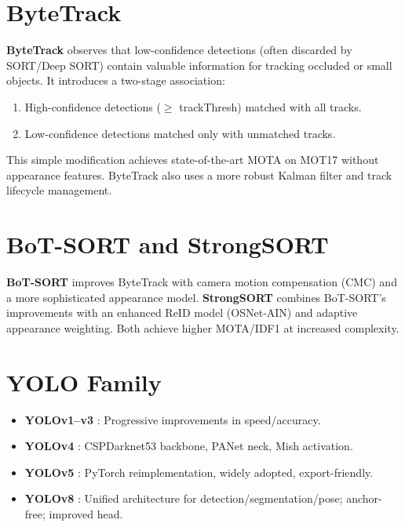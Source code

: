 \section{ByteTrack}
\label{sec:bytetrack}

\textbf{ByteTrack} \cite{zhang2021bytetrack} observes that low-confidence detections (often discarded by SORT/Deep SORT) contain valuable information for tracking occluded or small objects. It introduces a two-stage association:
\begin{enumerate}
    \item High-confidence detections ($\ge$ trackThresh) matched with all tracks.
    \item Low-confidence detections matched only with unmatched tracks.
\end{enumerate}
This simple modification achieves state-of-the-art MOTA on MOT17 without appearance features. ByteTrack also uses a more robust Kalman filter and track lifecycle management.

\section{BoT-SORT and StrongSORT}
\label{sec:botsort-strongsort}

\textbf{BoT-SORT} \cite{aharon2022botsort} improves ByteTrack with camera motion compensation (CMC) and a more sophisticated appearance model. \textbf{StrongSORT} \cite{du2023strongsort} combines BoT-SORT's improvements with an enhanced ReID model (OSNet-AIN) and adaptive appearance weighting. Both achieve higher MOTA/IDF1 at increased complexity.

\section{YOLO Family}
\label{sec:yolo-family}

\begin{itemize}
    \item \textbf{YOLOv1--v3} \cite{redmon2016yolo,redmon2017yolo9000,redmon2018yolov3}: Progressive improvements in speed/accuracy.
    \item \textbf{YOLOv4} \cite{bochkovskiy2020yolov4}: CSPDarknet53 backbone, PANet neck, Mish activation.
    \item \textbf{YOLOv5} \cite{jocher2021yolov5}: PyTorch reimplementation, widely adopted, export-friendly.
    \item \textbf{YOLOv8} \cite{jocher2023ultralytics}: Unified architecture for detection/segmentation/pose; anchor-free; improved head.
\end{itemize}

